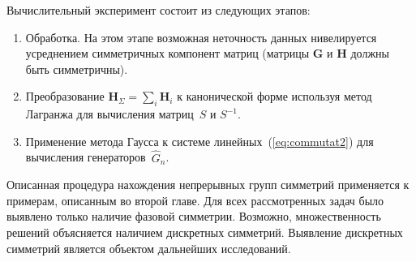 Вычислительный эксперимент состоит из следующих этапов:
\begin{enumerate}
  \item Обработка. На этом этапе возможная неточность данных нивелируется усреднением симметричных компонент матриц (матрицы $\textbf{G}$ и $\textbf{H}$ должны быть симметричны).
  \item %
  Преобразование $ {\textbf{H}}_{\Sigma} = \sum_{i} \textbf{H}_i$ к канонической форме используя метод Лагранжа для вычисления матриц~$S$ и $S^{-1} $.
  \item Применение метода Гаусса к системе линейных~(\ref{eq:commutat2}) для вычисления генераторов~$\hat{G}_n$.
\end{enumerate}


Описанная процедура нахождения непрерывных групп симметрий применяется к примерам, описанным во второй главе. Для всех рассмотренных задач было выявлено только наличие фазовой симметрии. Возможно, множественность решений объясняется наличием дискретных симметрий. Выявление дискретных симметрий является объектом дальнейших исследований.


